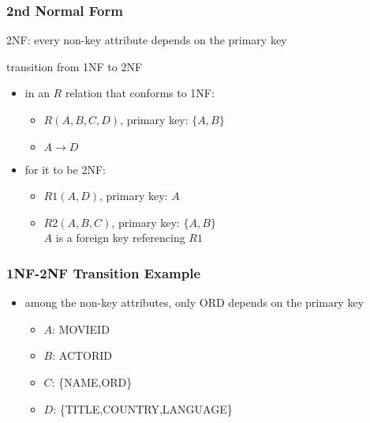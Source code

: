 \documentclass[dvipsnames]{beamer}
\begin{document}
\begin{frame}
  \frametitle{2nd Normal Form}

  \begin{definition}
    \alert{2NF}: every non-key attribute depends on the primary key
  \end{definition}

  \begin{block}{transition from 1NF to 2NF}
    \begin{itemize}
      \item in an $R$ relation that conforms to 1NF:
      \begin{itemize}
        \item $R(A,B,C,D)$, primary key: $\{A,B\}$
        \item $A \rightarrow D$
      \end{itemize}

      \pause
      \item for it to be 2NF:
      \begin{itemize}
        \item $R1(A,D)$, primary key: $A$
        \item $R2(A,B,C)$, primary key: $\{A,B\}$\\
          $A$ is a foreign key referencing $R1$
      \end{itemize}
    \end{itemize}
  \end{block}
\end{frame}

\begin{frame}
  \frametitle{1NF-2NF Transition Example}

  \begin{example}
    \begin{itemize}
      \item among the non-key attributes, only ORD depends on the primary key

      \pause
      \begin{itemize}
        \item $A$: MOVIEID
        \item $B$: ACTORID
        \item $C$: \{NAME,ORD\}
        \item $D$: \{TITLE,COUNTRY,LANGUAGE\}
      \end{itemize}
    \end{itemize}
  \end{example}
\end{frame}
\end{document}
